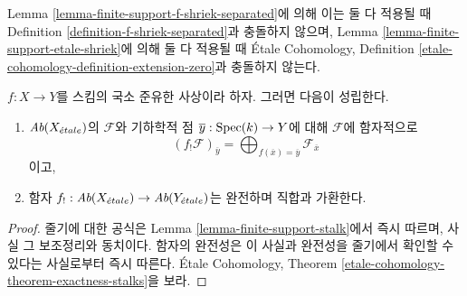 \noindent
Lemma \ref{lemma-finite-support-f-shriek-separated}에 의해 이는
둘 다 적용될 때 Definition \ref{definition-f-shriek-separated}과
충돌하지 않으며, Lemma \ref{lemma-finite-support-etale-shriek}에 의해
둘 다 적용될 때 \'Etale Cohomology, Definition
\ref{etale-cohomology-definition-extension-zero}과 충돌하지 않는다.

\begin{lemma}
\label{lemma-lqf-f-shriek-stalk}
$f : X \to Y$를 스킴의 국소 준유한 사상이라 하자. 그러면 다음이
성립한다.
\begin{enumerate}
\item $\textit{Ab}(X_{\acute{e}tale})$의 $\mathcal{F}$와 기하학적 점
$\overline{y} : \mathop{\mathrm{Spec}}(k) \to Y$에 대해 $\mathcal{F}$에 함자적으로
$$
(f_!\mathcal{F})_{\overline{y}} =
\bigoplus\nolimits_{f(\overline{x}) = \overline{y}} \mathcal{F}_{\overline{x}}
$$
이고,
\item 함자 $f_! : \textit{Ab}(X_{\acute{e}tale}) \to \textit{Ab}(Y_{\acute{e}tale})$는
완전하며 직합과 가환한다.
\end{enumerate}
\end{lemma}

\begin{proof}
줄기에 대한 공식은 Lemma \ref{lemma-finite-support-stalk}에서 즉시
따르며, 사실 그 보조정리와 동치이다. 함자의 완전성은 이 사실과
완전성을 줄기에서 확인할 수 있다는 사실로부터 즉시 따른다.
\'Etale Cohomology, Theorem
\ref{etale-cohomology-theorem-exactness-stalks}을 보라.
\end{proof}


